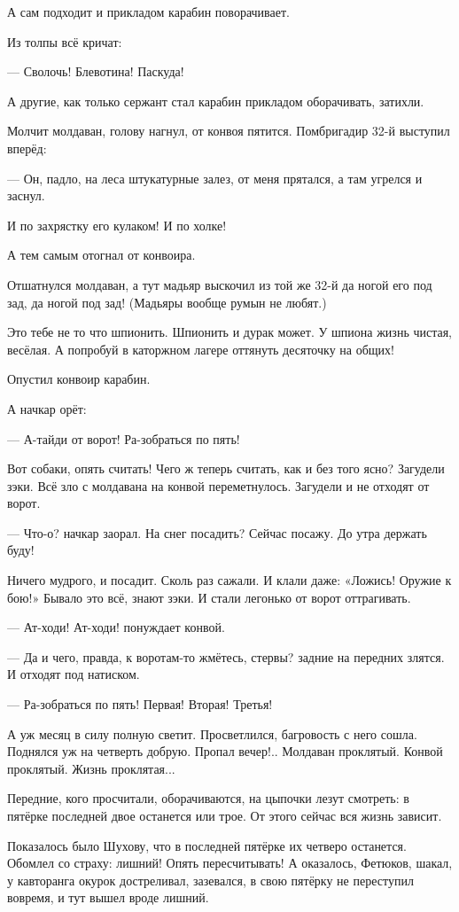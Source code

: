 А сам подходит и прикладом карабин поворачивает.

Из толпы всё кричат:

--- Сволочь! Блевотина! Паскуда!

А другие, как только сержант стал карабин прикладом оборачивать, затихли.

Молчит молдаван, голову нагнул, от конвоя пятится. Помбригадир 32-й выступил вперёд:

--- Он, падло, на леса штукатурные залез, от меня прятался, а там угрелся и заснул.

И по захрястку его кулаком! И по холке!

А тем самым отогнал от конвоира.

Отшатнулся молдаван, а тут мадьяр выскочил из той же 32-й да ногой его под зад, да ногой под
зад! (Мадьяры вообще румын не любят.)

Это тебе не то что шпионить. Шпионить и дурак может. У шпиона жизнь чистая, весёлая. А
попробуй в каторжном лагере оттянуть десяточку на общих!

Опустил конвоир карабин.

А начкар орёт:

--- А-тайди от ворот! Ра-зобраться по пять!

Вот собаки, опять считать! Чего ж теперь считать, как и без того ясно? Загудели зэки. Всё зло с
молдавана на конвой переметнулось. Загудели и не отходят от ворот.

--- Что-о? \dash начкар заорал. \Dash На снег посадить? Сейчас посажу. До утра держать буду!

Ничего мудрого, и посадит. Сколь раз сажали. И клали даже: «Ложись! Оружие к бою!» Бывало это
всё, знают зэки. И стали легонько от ворот оттрагивать.

--- Ат-ходи! Ат-ходи! \dash понуждает конвой.

--- Да и чего, правда, к воротам-то жмётесь, стервы? \dash задние на передних злятся. И отходят под
натиском.

--- Ра-зобраться по пять! Первая! Вторая! Третья!

А уж месяц в силу полную светит. Просветлился, багровость с него сошла. Поднялся уж на
четверть добрую. Пропал вечер!.. Молдаван проклятый. Конвой проклятый. Жизнь проклятая...

Передние, кого просчитали, оборачиваются, на цыпочки лезут смотреть: в пятёрке последней
двое останется или трое. От этого сейчас вся жизнь зависит.

Показалось было Шухову, что в последней пятёрке их четверо останется. Обомлел со страху:
лишний! Опять пересчитывать! А оказалось, Фетюков, шакал, у кавторанга окурок достреливал,
зазевался, в свою пятёрку не переступил вовремя, и тут вышел вроде лишний.

